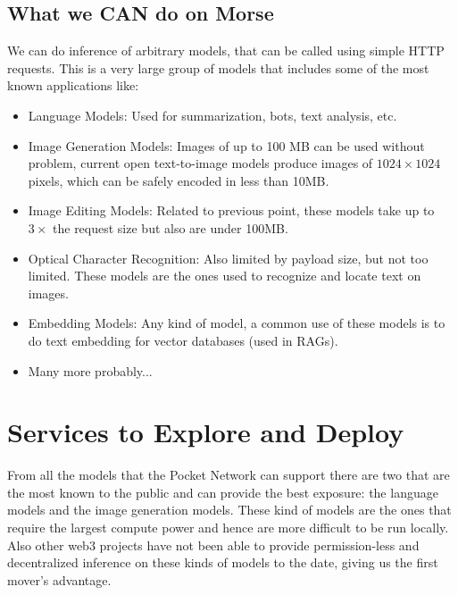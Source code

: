 \subsection{What we CAN do on Morse}
We can do inference of arbitrary models, that can be called using simple HTTP requests. This is a very large group of models that includes some of the most known applications like:
\begin{itemize}
    \item Language Models: Used for summarization, bots, text analysis, etc.
    \item Image Generation Models: Images of up to 100 MB can be used without problem, current open text-to-image models produce images of $1024\times1024$ pixels, which can be safely encoded in less than 10MB.
    \item Image Editing Models: Related to previous point, these models take up to $3\times$ the request size but also are under 100MB.
    \item Optical Character Recognition: Also limited by payload size, but not too limited. These models are the ones used to recognize and locate text on images.
    \item Embedding Models: Any kind of model, a common use of these models is to do text embedding for vector databases (used in RAGs).
    \item Many more probably...
\end{itemize}



\section{Services to Explore and Deploy}
From all the models that the Pocket Network can support there are two that are the most known to the public and can provide the best exposure: the language models and the image generation models. These kind of models are the ones that require the largest compute power and hence are more difficult to be run locally. Also other web3 projects have not been able to provide permission-less and decentralized inference on these kinds of models to the date, giving us the first mover's advantage.

